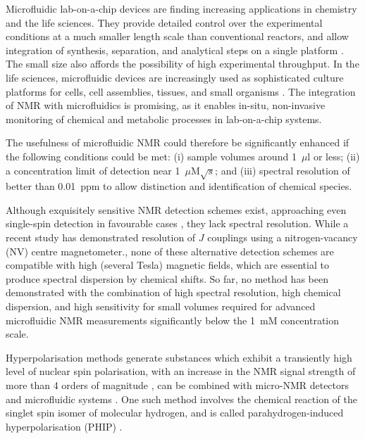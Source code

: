 Microfluidic lab-on-a-chip devices are finding increasing applications in
chemistry and the
life sciences. They provide detailed control over the experimental
conditions at a much smaller length scale than conventional reactors, and
allow integration of synthesis, separation, and analytical steps on
a single platform \cite{Wang:2006en,Theberge:2012iq,Hoang:2011du,Ohno:2008da,Zhou:2004id,
Fang:2018ib,Hoang:2011ee,Gunther:2006vd}. The small size also affords the possibility of
high experimental throughput.
In the life sciences, microfluidic devices are increasingly used as
sophisticated culture platforms for cells,
cell assemblies, tissues, and small organisms
\cite{Manz:1990vc,Whitesides:2006vi,
ElAli:2006ci,West:2008jd,Neuzil:2012gc,Gracz:2015co}.
The integration of NMR with microfluidics
\cite{Ryan:2012ke,Badilita:2011td,Spengler:2014ir,Finch:2016gv} is promising, as
it enables in-situ, non-invasive monitoring of chemical and metabolic processes
in lab-on-a-chip systems.

The usefulness of microfluidic NMR could therefore be significantly
enhanced if the following conditions could be met:
(i) sample volumes around 1~$\mu$l or less;
(ii) a concentration limit of
detection near  1~$\mu$M$\sqrt{s}$; and
(iii)  spectral
resolution of better than 0.01~ppm to allow distinction and identification
of chemical species.

Although exquisitely sensitive NMR detection schemes exist,
approaching even single-spin detection in favourable cases
\cite{Rugar:1992dm,Rugar:2004bc,Mamin:2007ff,Poggio:2010jf,
Maze:2008cs,Staudacher:2013kn,Rugar:2015by,McDermott:2002hp,
Budker:2007hz,Xu:2006kg,Blanchard:2013gs}, they lack spectral resolution.
While a recent study
has demonstrated resolution of $J$ couplings using a nitrogen-vacancy
(NV) centre magnetometer.\cite{Glenn:2018ct}, none of these
alternative detection schemes are compatible with high (several Tesla)
magnetic fields, which are essential to produce spectral dispersion
by chemical shifts.
So far, no method has been demonstrated with the combination of high
spectral resolution, high chemical dispersion,
and high sensitivity for small volumes required for
advanced microfluidic NMR measurements significantly
below the 1~mM concentration scale.

Hyperpolarisation methods generate substances which exhibit a transiently high
level of nuclear spin polarisation, with an increase in the NMR signal strength
of more than 4 orders of magnitude \cite{munnemann2011nuclear}, can be combined
with micro-NMR detectors and microfluidic systems \cite{McDonnell:2005dn,Desvaux:2009bq,Telkki:2010vg,Paciok:2011ek,JimenezMartinez:2014et,Causier:2015fg,eills-hale2018EuromarPHIP,Bordonali:2019jqa}.
One such method
involves the chemical reaction of the singlet spin isomer of molecular
hydrogen, and is called parahydrogen-induced hyperpolarisation (PHIP)
\cite{hovener2018parahydrogen,duckett2012application,gloggler2013hydrogen,green2012theory}.


